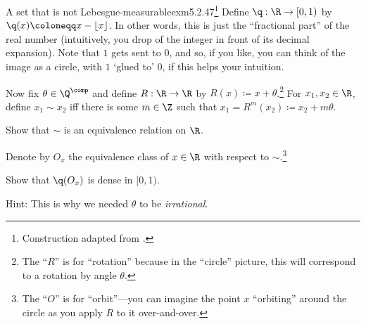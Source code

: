 \begin{exm}{A set that is not Lebesgue-measurable}{exm5.2.47}\footnote{Construction adapted from \cite[pg.~407]{Pugh}.}
Define $\q :\R \rightarrow [0,1)$ by $\q (x)\coloneqq x-\lfloor x\rfloor$.  In other words, this is just the ``fractional part'' of the real number (intuitively, you drop of the integer in front of its decimal expansion).  Note that $1$ gets sent to $0$, and so, if you like, you can think of the image as a circle, with $1$ `glued to' $0$, if this helps your intuition.

Now fix $\theta \in \Q ^{\comp}$ and define $R:\R \rightarrow \R$ by $R(x)\coloneqq x+\theta$.\footnote{The ``$R$'' is for ``rotation'' because in the ``circle'' picture, this will correspond to a rotation by angle $\theta$.}  For $x_1,x_2\in \R$, define $x_1\sim x_2$ iff there is some $m\in \Z$ such that $x_1=R^m(x_2)\coloneqq x_2+m\theta$.
\begin{exr}[breakable=false]{}{}
Show that $\sim$ is an equivalence relation on $\R$.
\end{exr}
Denote by $O_x$ the equivalence class of $x\in \R$ with respect to $\sim$.\footnote{The ``$O$'' is for ``orbit''---you can imagine the point $x$ ``orbiting'' around the circle as you apply $R$ to it over-and-over.}
\begin{exr}[breakable=false]{}{}
Show that $\q (O_x)$ is dense in $[0,1)$.
\begin{rmk}
Hint:  This is why we needed $\theta$ to be \emph{irrational}.
\end{rmk}
\end{exr}


\end{exm}
